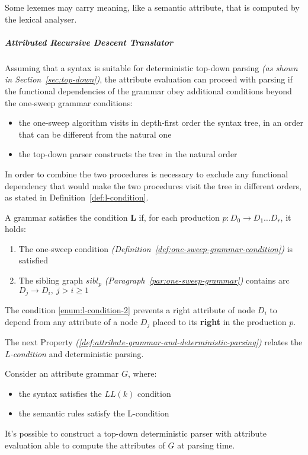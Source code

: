 \documentclass[english]{article}
\begin{document}
Some lexemes may carry meaning, like a semantic attribute, that is computed by the lexical analyser.

\subparagraph{Attributed Recursive Descent Translator}

Assuming that a syntax is suitable for deterministic top-down parsing \textit{(as shown in Section~\ref{sec:top-down})}, the attribute evaluation can proceed with parsing if the functional dependencies of the grammar obey additional conditions beyond the one-sweep grammar conditions:

\begin{itemize}
  \item the one-sweep algorithm visits in depth-first order the syntax tree, in an order that can be different from the natural one
  \item the top-down parser constructs the tree in the natural order
\end{itemize}

In order to combine the two procedures is necessary to exclude any functional dependency that would make the two procedures visit the tree in different orders, as stated in Definition~\ref{def:l-condition}.

\begin{definition}[L-condition]
  \label{def:l-condition}
  A grammar satisfies the condition \textbf{L} if, for each production \(p: D_0 \rightarrow D_1 \ldots D_r\), it holds:

  \begin{enumerate}[label=\alph*., ref=(\alph*)]
    \item\label{enum:l-condition-1} The one-sweep condition \textit{(Definition~\ref{def:one-sweep-grammar-condition})} is satisfied
    \item\label{enum:l-condition-2} The sibling graph \(\textit{sibl}_p\) \textit{(Paragraph~\ref{par:one-sweep-grammar})} contains arc \(D_j \rightarrow D_i, \ j > i \geq 1\)
  \end{enumerate}
\end{definition}

The condition \ref{enum:l-condition-2} prevents a right attribute of node \(D_i\) to depend from any attribute of a node \(D_j\) placed to its \textbf{right} in the production \(p\).

\bigskip
The next Property \textit{(\ref{def:attribute-grammar-and-deterministic-parsing})} relates the \textit{L-condition} and deterministic parsing.

\begin{definition}
  \label{def:attribute-grammar-and-deterministic-parsing}
  Consider an attribute grammar \(G\), where:

  \begin{itemize}
    \item the syntax satisfies the \(LL(k)\) condition
    \item the semantic rules satisfy the L-condition
  \end{itemize}

  It's possible to construct a top-down deterministic parser with attribute evaluation able to compute the attributes of \(G\) at parsing time.
\end{definition}
\end{document}
